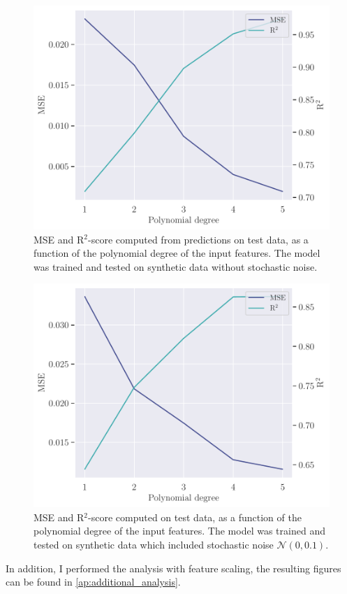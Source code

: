 \begin{figure}
    \centering
    \includegraphics[width=0.9\linewidth]{project-1/latex/figures/ols_error_smooth_N50.pdf}
    \caption{MSE and R$^{2}$-score computed from predictions on test data, as a function of the polynomial degree of the input features. The model was trained and tested on synthetic data without stochastic noise.}
    \label{fig:ols_error_smooth}
\end{figure}
\begin{figure}
    \centering
    \includegraphics[width=0.9\linewidth]{project-1/latex/figures/ols_error_N50.pdf}
    \caption{MSE and R$^{2}$-score computed on test data, as a function of the polynomial degree of the input features. The model was trained and tested on synthetic data which included stochastic noise $\mathcal{N}(0, 0.1)$.}
    \label{fig:ols_error}
\end{figure}
In addition, I performed the analysis with feature scaling, the resulting figures can be found in \ref{ap:additional_analysis}.

